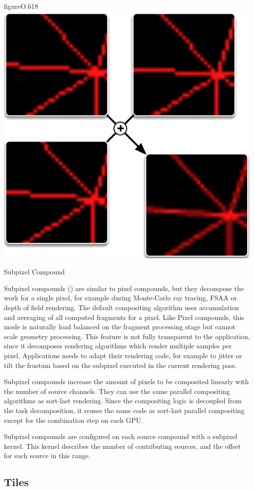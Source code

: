 \begin{wrapfloat}{figure}{O}{.618\textwidth}
 \includegraphics[width=.618\textwidth]{images/Subpixel}
 {\caption{\label{fSubpixel}Subpixel Compound}}
\end{wrapfloat}

Subpixel compounds () are similar to pixel compounds, but they
decompose the work for a single pixel, for example during Monte-Carlo ray
tracing, FSAA or depth of field rendering. The default compositing algorithm
uses accumulation and averaging of all computed fragments for a pixel. Like
Pixel compounds, this mode is naturally load balanced on the fragment
processing stage but cannot scale geometry processing. This feature is not
fully transparent to the application, since it decomposes rendering algorithms
which render multiple samples per pixel. Applications needs to adapt their
rendering code, for example to jitter or tilt the frustum based on the subpixel
executed in the current rendering pass.

Subpixel compounds increase the amount of pixels to be composited linearly with
the number of source channels. They can use the same parallel compositing
algorithms as sort-last rendering. Since the compositing logic is decoupled
from the task decomposition, it reuses the same code as sort-last parallel
compositing except for the combination step on each GPU.

Subpixel compounds are configured on each source compound with a subpixel
kernel. This kernel describes the number of contributing sources, and the
offset for each source in this range.

\subsection{Tiles \label{sTile}}

